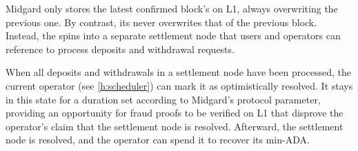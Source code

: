\documentclass[../midgard.tex]{subfiles}
\begin{document}
Midgard only stores the latest confirmed block's  on L1, always overwriting the previous one.
By contrast, its  never overwrites that of the previous block.
Instead, the  spins into a separate settlement node that users and operators can reference to process deposits and withdrawal requests.

When all deposits and withdrawals in a settlement node have been processed, the current operator (see \cref{h:scheduler}) can mark it as optimistically resolved.
It stays in this state for a duration set according to Midgard's  protocol parameter, providing an opportunity for fraud proofs to be verified on L1 that disprove the operator's claim that the settlement node is resolved.
Afterward, the settlement node is resolved, and the operator can spend it to recover its min-ADA.
\end{document}
